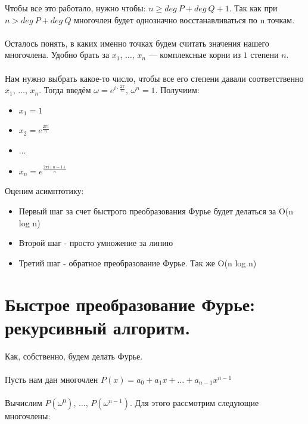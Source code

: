 Чтобы все это работало, нужно чтобы:  $n \geqslant deg \ P + deg \ Q + 1$. Так как при $n > deg \ P + deg \ Q$ многочлен будет однозначно восстанавливаться по n точкам.
\\
\\
Осталось понять, в каких именно точках будем считать значения нашего многочлена. Удобно брать за $x_1$, $\dots$, $x_n$ — комплексные корни из $1$ степени $n$.
\\
\\
Нам нужно выбрать какое-то число, чтобы все его степени давали соответственно $x_1$, $\dots$, $x_n$. Тогда введём $\omega = e^{i \cdot \frac{2 \pi}{n}}$, $\omega^n = 1$. Получиим:
\begin{itemize}
    \item $x_1 = 1$
    \item $x_2 = e^{\frac{2 \pi i}{n}}$
    \item $\dots$
    \item $x_n = e^{\frac{2 \pi i(n-1)}{n}}$
\end{itemize}

Оценим асимптотику:
 \begin{itemize}
     \item  Первый шаг за счет быстрого преобразования Фурье будет делаться за O(n log n)
      \item Второй шаг - просто умножение за линию
      \item  Третий шаг - обратное преобразование Фурье. Так же O(n log n)
 \end{itemize}
\newpage{}

\section{Быстрое преобразование Фурье: рекурсивный алгоритм.}Как, собственно, будем делать Фурье.
\\ \\
Пусть нам дан многочлен $P (x) = a_0 + a_1 x + \dots + a_{n - 1} x^{n - 1}$
\\
\\
Вычислим $P ({\omega^0})$, $\dots$, $P (\omega^{n - 1})$. Для этого рассмотрим следующие многочлены:

